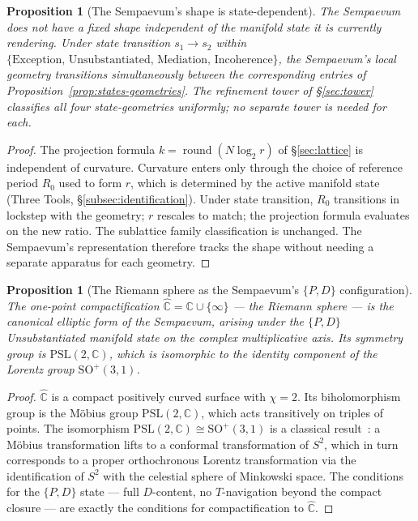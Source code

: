 \documentclass[11pt,a4paper]{article}
\newtheorem{proposition}[theorem]{Proposition}
\theoremstyle{definition}
\theoremstyle{remark}
\newcommand{\C}{\mathbb{C}}
\DeclareMathOperator{\round}{round}
\begin{document}
\begin{proposition}[The Sempaevum's shape is state-dependent]\label{prop:shape-state}
The Sempaevum does not have a fixed shape independent of the manifold state it is currently rendering. Under state transition $s_{1} \to s_{2}$ within $\{\text{Exception, Unsubstantiated, Mediation, Incoherence}\}$, the Sempaevum's local geometry transitions simultaneously between the corresponding entries of Proposition~\ref{prop:states-geometries}. The refinement tower of \S\ref{sec:tower} classifies all four state-geometries uniformly; no separate tower is needed for each.
\end{proposition}

\begin{proof}
The projection formula $k = \round(N\log_{2} r)$ of \S\ref{sec:lattice} is independent of curvature. Curvature enters only through the choice of reference period $R_{0}$ used to form $r$, which is determined by the active manifold state (Three Tools, \S\ref{subsec:identification}). Under state transition, $R_{0}$ transitions in lockstep with the geometry; $r$ rescales to match; the projection formula evaluates on the new ratio. The sublattice family classification is unchanged. The Sempaevum's representation therefore tracks the shape without needing a separate apparatus for each geometry.
\end{proof}

\begin{proposition}[The Riemann sphere as the Sempaevum's $\{P,D\}$ configuration]\label{prop:riemann-sphere}
The one-point compactification $\widehat{\C} = \C \cup \{\infty\}$ --- the Riemann sphere --- is the canonical elliptic form of the Sempaevum, arising under the $\{P,D\}$ Unsubstantiated manifold state on the complex multiplicative axis. Its symmetry group is $\mathrm{PSL}(2,\C)$, which is isomorphic to the identity component of the Lorentz group $\mathrm{SO}^{+}(3,1)$.
\end{proposition}

\begin{proof}
$\widehat{\C}$ is a compact positively curved surface with $\chi = 2$. Its biholomorphism group is the Möbius group $\mathrm{PSL}(2,\C)$, which acts transitively on triples of points. The isomorphism $\mathrm{PSL}(2,\C)\cong\mathrm{SO}^{+}(3,1)$ is a classical result~\cite{Needham}: a Möbius transformation lifts to a conformal transformation of $S^{2}$, which in turn corresponds to a proper orthochronous Lorentz transformation via the identification of $S^{2}$ with the celestial sphere of Minkowski space. The conditions for the $\{P,D\}$ state --- full $D$-content, no $T$-navigation beyond the compact closure --- are exactly the conditions for compactification to $\widehat{\C}$.
\end{proof}
\end{document}
